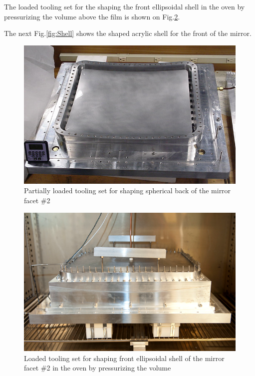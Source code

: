 The loaded tooling set for the shaping the front ellipsoidal shell in the oven by pressurizing the volume above the film is shown on  Fig.\ref{fig:Pres_Shaping_Front}.

The next Fig.\ref{fig:Shell} shows the shaped acrylic shell for the front of the mirror.

\begin{figure}[h]
    \centering
    \includegraphics[width=0.95\linewidth]{images/Vac_Mol_Back.png}
    \caption{Partially loaded tooling set for shaping spherical back of the mirror facet \#2}
    \label{fig:Vac_Mol_Back}
\end{figure}

\begin{figure}[h]
    \centering
    \includegraphics[width=0.95\linewidth]{images/Pres_Shaping_Front.png}
    \caption{Loaded tooling set for shaping front ellipsoidal shell of the mirror facet \#2 in the oven by pressurizing the volume}
    \label{fig:Pres_Shaping_Front}
\end{figure}

